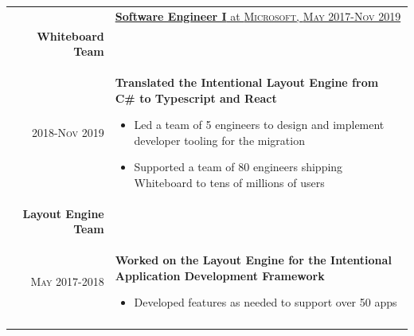 \documentclass[letterpaper,10pt]{article} %
\newcommand{\work}[4]{\textsc{#1} & \underline{\textbf{#2} at \textsc{#3}}\\ 
\\
& #4\\
\multicolumn{2}{c}{} \\}
\newcommand{\workTwo}[9]{& \underline{\textbf{#2} at \textsc{#3},  \textsc{#1}}\\
\textbf{#4} \\
\textsc{#5} & #6\\
\textbf{#7} \\
\textsc{#8} & #9 \\
\multicolumn{2}{c}{} \\}
\begin{document}
\begin{tabular}{r|p{14.5cm}}
{%


}


\workTwo{May 2017-Nov 2019}{Software Engineer I}{Microsoft}
{ Whiteboard Team }{2018-Nov 2019}{

\textbf{Translated the Intentional Layout Engine from C\# to Typescript and React}
\begin{itemize}
	\item{Led a team of 5 engineers to design and implement developer tooling for the migration}
	\item{Supported a team of 80 engineers shipping Whiteboard to tens of millions of users}
\end{itemize} 

}
{ Layout Engine Team}{May 2017-2018}{
\textbf{Worked on the Layout Engine for the Intentional Application Development Framework}
\begin{itemize}
	\item{Developed features as needed to support over 50 apps}
\end{itemize}


}

\end{tabular}
\vspace{-7mm} %

\end{document}

